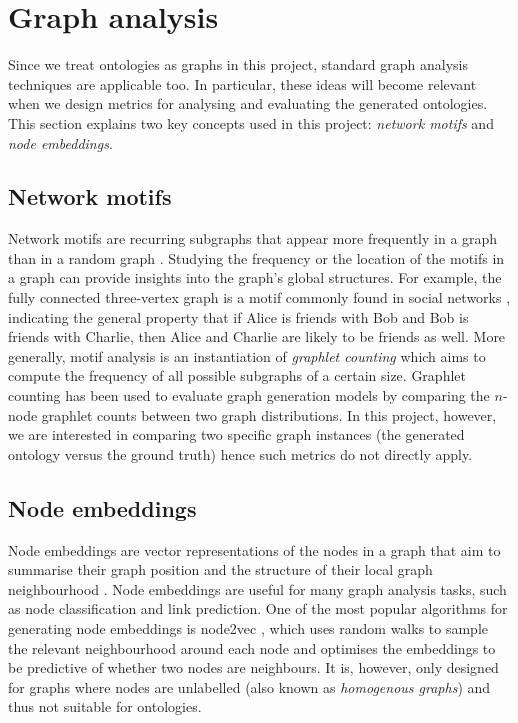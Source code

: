\section{Graph analysis}

Since we treat ontologies as graphs in this project, standard graph analysis techniques are applicable too. In particular, these ideas will become relevant when we design metrics for analysing and evaluating the generated ontologies. This section explains two key concepts used in this project: \emph{network motifs} and \emph{node embeddings}.

\subsection{Network motifs}  \label{sec:network-motifs}

Network motifs are recurring subgraphs that appear more frequently in a graph than in a random graph \cite{milo2002network}. Studying the frequency or the location of the motifs in a graph can provide insights into the graph's global structures. For example, the fully connected three-vertex graph is a motif commonly found in social networks \cite{stone2019network}, indicating the general property that if Alice is friends with Bob and Bob is friends with Charlie, then Alice and Charlie are likely to be friends as well. More generally, motif analysis is an instantiation of \emph{graphlet counting} \cite{ribeiro2021survey} which aims to compute the frequency of all possible subgraphs of a certain size. Graphlet counting has been used to evaluate graph generation models \cite{you2018graphrnn} by comparing the $n$-node graphlet counts between two graph distributions. In this project, however, we are interested in comparing two specific graph instances (the generated ontology versus the ground truth) hence such metrics do not directly apply.

\subsection{Node embeddings}  \label{sec:node-embeddings}

Node embeddings are vector representations of the nodes in a graph that aim to summarise their graph position and the structure of their local graph neighbourhood \cite{hamilton2020graph}. Node embeddings are useful for many graph analysis tasks, such as node classification and link prediction. One of the most popular algorithms for generating node embeddings is node2vec \cite{grover2016node2vec}, which uses random walks to sample the relevant neighbourhood around each node and optimises the embeddings to be predictive of whether two nodes are neighbours. It is, however, only designed for graphs where nodes are unlabelled (also known as \emph{homogenous graphs}) and thus not suitable for ontologies.

